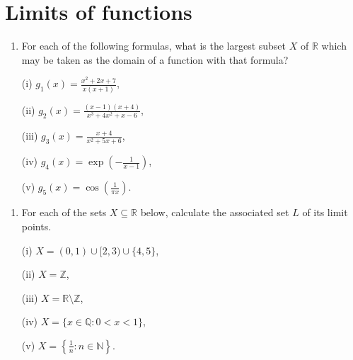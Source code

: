 \documentclass[letterpaper,10pt,english]{jupyterBook}
\begin{document}
\section{Limits of functions}
\label{\detokenize{Problems:limits-of-functions}}\label{\detokenize{Problems:ch2prob}}\label{\detokenize{Problems:id1}}\begin{enumerate}
%
\item {} 
\sphinxAtStartPar
For each of the following formulas, what is the largest subset \(X\) of \(\mathbb{R}\)  which may be taken as the domain of a function with that formula?

\sphinxAtStartPar
(i) \(g_{1}(x) = \displaystyle\frac{x^{2} + 2x + 7}{x(x+1)}\),

\sphinxAtStartPar
(ii) \(g_{2}(x) = \displaystyle\frac{(x-1)(x+4)}{x^{3} + 4x^{2} + x - 6}\),

\sphinxAtStartPar
(iii) \(g_{3}(x) = \displaystyle\frac{x+4}{x^{2}+5x + 6}\),

\sphinxAtStartPar
(iv) \(g_{4}(x) = \exp{\left(-\displaystyle\frac{1}{x-1}\right)}\),

\sphinxAtStartPar
(v) \(g_{5}(x) = \cos\left(\displaystyle\frac{1}{\pi x}\right)\).

\end{enumerate}
\label{\detokenize{Problems:id2}}\begin{enumerate}
%
\setcounter{enumi}{1}
\item {} 
\sphinxAtStartPar
{} For each of the sets \(X\subseteq\mathbb{R}\) below, calculate the associated set \(L\) of its limit points.

\sphinxAtStartPar
(i) \(X=(0,1)\cup[2,3)\cup\{4,5\}\),

\sphinxAtStartPar
(ii) \(X=\mathbb{Z}\),

\sphinxAtStartPar
(iii) \(X=\mathbb{R}\setminus\mathbb{Z}\),

\sphinxAtStartPar
(iv) \(X=\{x\in\mathbb{Q}:0<x<1\}\),

\sphinxAtStartPar
(v) \(X=\displaystyle\left\{\frac{1}{n}:n\in\mathbb{N}\right\}\).

\end{enumerate}
\end{document}
